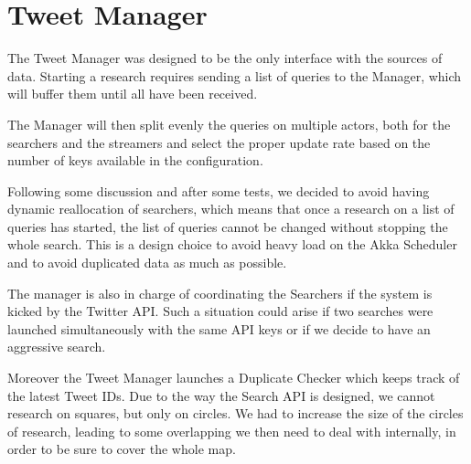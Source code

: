 \section{Tweet Manager}

The Tweet Manager was designed to be the only interface with the sources of data. Starting a research requires sending a list of queries to the Manager, which will buffer them until all have been received.

The Manager will then split evenly the queries on multiple actors, both for the searchers and the streamers and select the proper update rate based on the number of keys available in the configuration.

Following some discussion and after some tests, we decided to avoid having dynamic reallocation of searchers, which means that once a research on a list of queries has started, the list of queries cannot be changed without stopping the whole search. This is a design choice to avoid heavy load on the Akka Scheduler and to avoid duplicated data as much as possible.

The manager is also in charge of coordinating the Searchers if the system is kicked by the Twitter API. Such a situation could arise if two searches were launched simultaneously with the same API keys or if we decide to have an aggressive search.

Moreover the Tweet Manager launches a Duplicate Checker which keeps track of the latest Tweet IDs. Due to the way the Search API is designed, we cannot research on squares, but only on circles. We had to increase the size of the circles of research, leading to some overlapping we then need to deal with internally, in order to be sure to cover the whole map.
